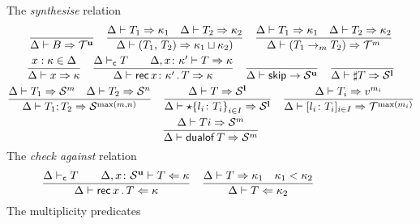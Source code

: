 \begin{figure}[h!]
  The \emph{synthesise} relation \hfill{}
  \begin{gather*}
    \frac{}{\algkindout{\tcBase}{\kindt^\Un}}
    \quad 
    \frac{
      \algkindout{T_1}{\kind_1}
      \quad
      \algkindout{T_2}{\kind_2}
    }{
      \algkindout{\tPair{T_1}{T_2}}{\kind_1\lub \kind_2)}
    }
    \quad
    \frac{
      \algkindout{T_1}{\kind_1}
      \quad
      \algkindout{T_2}{\kind_2}
    }{
      \algkindout{(\tFun{T_1}{T_2})}{\kindt^m}
    }
    \\
    \frac{x : \kind \in \kindEnv}{\algkindout x \kind}
   \quad
  \frac{
    \isContractive T
    \qquad
    \algkindout[\kindEnv, x\colon \kind'] T \kind
  }{
    \algkindout{\tRec {x\colon \kind'} T}{\kind}
  }
  \quad
  \frac{}{\kindEnv \Alg \tSkip \rightarrow \kinds^\Un}
  \quad 
  \frac{}{\algkindout{\tMsg T}{\kinds^\Lin}}
  \\
  \frac{
    \algkindout{T_1}{\kinds^m}
    \quad
    \algkindout{T_2}{\kinds^n}
  }{
    \algkindout{\tSemi{T_1}{T_2}}{\kinds^{\max(m,n)}}
  }
  \quad
  \frac{
    \algkindout{T}{\kinds^\Lin}
  }{
    \algkindout{\tChoice{\{l_i\colon T_i\}}_{i\in I}}{\kinds^\Lin}
  }
  \quad
  \frac{
    \algkindout{T_i}{v^{m_i}}
  }{
    \algkindout{\tData{l_i\colon T_i}_{i\in I}}{\kindt^{\max(m_i)}}
  }  
  \\
  \frac{
    \algkindout{Ti}{\kinds^m}
  }{
    \algkindout{\tDualof T}{\kinds^m}
  }
  \end{gather*}
  The \emph{check against} relation\hfill{}
  \begin{equation*}
    \frac{
      \isContractive T
      \qquad
      \algkindin[\kindEnv, x\colon \kinds^\Un] T \kind
    }{
      \algkindin{\tRec xT}{\kind}
    }
    \quad
    \frac{
      \algkindout{T}{\kind_1}
      \quad
      \isSubkind{\kind_1}{\kind_2}
    }{
      \algkindin T {\kind_2}
    }
  \end{equation*}
  The multiplicity predicates \hfill{}\quad{}

\end{figure}
